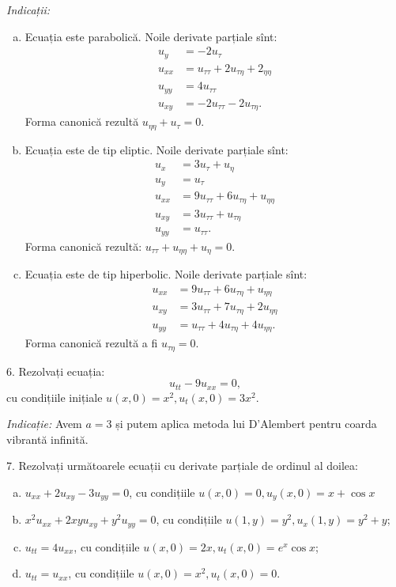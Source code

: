 \emph{Indicații:}
\begin{enumerate}[(a)]
    \item Ecuația este parabolică. Noile derivate parțiale sînt:
        \begin{align*}
            u_y &= -2u_\tau \\
            u_{xx} &= u_{\tau\tau} + 2u_{\tau\eta} + 2_{\eta\eta} \\
            u_{yy} &= 4u_{\tau\tau} \\
            u_{xy} &= -2u_{\tau\tau} - 2u_{\tau\eta}.
        \end{align*}
        Forma canonică rezultă $ u_{\eta\eta} + u_\tau = 0 $.
    \item Ecuația este de tip eliptic. Noile derivate parțiale sînt:
        \begin{align*}
            u_x &= 3u_\tau + u_\eta \\
            u_y &= u_\tau \\
            u_{xx} &= 9u_{\tau\tau} + 6u_{\tau\eta} + u_{\eta\eta} \\
            u_{xy} &= 3u_{\tau\tau} + u_{\tau\eta} \\
            u_{yy} &= u_{\tau\tau}.
        \end{align*}
        Forma canonică rezultă: $ u_{\tau\tau} + u_{\eta\eta} + u_\eta = 0 $.
    \item Ecuația este de tip hiperbolic. Noile derivate parțiale sînt:
        \begin{align*}
            u_{xx} &= 9u_{\tau\tau} + 6u_{\tau\eta} + u_{\eta\eta} \\
            u_{xy} &= 3u_{\tau\tau} + 7u_{\tau\eta} + 2u_{\eta\eta} \\
            u_{yy} &= u_{\tau\tau} + 4u_{\tau\eta} + 4u_{\eta\eta}.
        \end{align*}
        Forma canonică rezultă a fi $ u_{\tau\eta} = 0 $.
\end{enumerate}

\vspace{1cm}

6. Rezolvați ecuația:
\[
    u_{tt} - 9 u_{xx} = 0,
\]
cu condițiile inițiale $ u(x, 0) = x^2, u_t(x, 0) = 3x^2 $.

\emph{Indicație:} Avem $ a = 3 $ și putem aplica metoda lui D'Alembert pentru
coarda vibrantă infinită.

\vspace{1cm}

7. Rezolvați următoarele ecuații cu derivate parțiale de ordinul al doilea:
\begin{enumerate}[(a)]
    \item $ u_{xx} + 2u_{xy} - 3u_{yy} = 0 $, cu condițiile $ u(x, 0) = 0, u_y(x, 0) = x + \cos x $
    \item $ x^2 u_{xx} + 2xy u_{xy} + y^2 u_{yy} = 0 $, cu condițiile $ u(1, y) = y^2, u_x(1, y) = y^2 + y $;
    \item $ u_{tt} = 4u_{xx} $, cu condițiile $ u(x, 0) = 2x, u_t(x, 0) = e^x \cos x $;
    \item $ u_{tt} = u_{xx} $, cu condițiile $ u(x, 0) = x^2, u_t(x, 0) = 0 $.
\end{enumerate}

